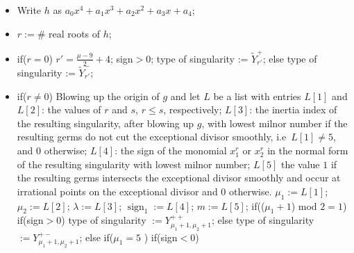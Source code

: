 \documentclass{amsproc}
\DeclareMathOperator{\sign}{sign}
\begin{document}
\begin{itemize}
\item Write $h$ as $a_0x^4+a_1x^3+a_2x^2+a_3x+a_4$;
\item $r := \#$ real roots of $h$;
\item if($r=0$)\newline
\phantom{}$r'=\frac{\mu-9}{2}+4$;\newline
\phantom\quad sign$>0$;\newline
\phantom{}\quad\quad type of singularity := $\widetilde Y_{r'}^+$;\newline
\phantom{}\quad else\newline
\phantom{}\quad\quad type of singularity := $\widetilde Y_{r'}^-$;
\item if($r\neq 0$)\newline
\phantom{}\quad Blowing up the origin of $g$ and let $L$ be a list with entries $L[1]$ and $L[2]$: the values of $r$ and $s$, $r\le s$, respectively; $L[3]$: the inertia index of the resulting singularity, after blowing up $g$, with lowest milnor number if the resulting germs do not cut the exceptional divisor smoothly, i.e~$L[1]\neq 5$, and $0$ otherwise; $L[4]$: the sign of the monomial $x_1^r$ or $x_2^r$ in the normal form of the resulting singularity with lowest milnor number; $L[5]$ the value $1$ if the resulting germs intersects the exceptional divisor smoothly and occur at irrational points on the exceptional divisor and $0$ otherwise.\newline
\phantom{}\quad $\mu_1:=L[1]$;\newline
\phantom{}\quad $\mu_2:=L[2]$;\newline
\phantom{}\quad $\lambda:=L[3]$;\newline
\phantom{}\quad $\sign_1:= L[4]$;\newline
\phantom{}\quad $m:=L[5]$;\newline
\phantom{}\quad if(($\mu_1+1$) mod $2=1$)\newline
\phantom{}\quad\quad if(sign$>0$)\newline
\phantom{}\quad\quad\quad type of singularity $:= Y_{\mu_1+1,\mu_2+1}^{++}$;\newline
\phantom{}\quad\quad else\newline
\phantom{}\quad\quad\quad type of singularity $:=Y_{\mu_1+1,\mu_2+1}^{+-}$;\newline
\phantom{}\quad else\newline
\phantom{}\quad\quad if($\mu_1=5$ )\newline
\phantom{}\quad\quad\quad\quad if(sign$<0$)\newline

\end{itemize}
\end{document}
